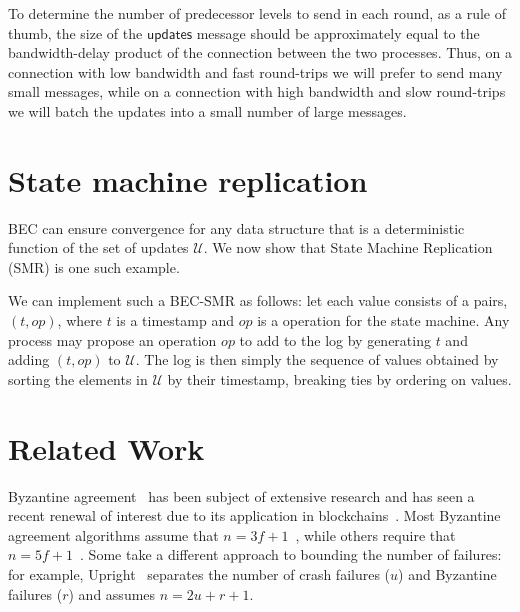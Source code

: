 \documentclass[manuscript,anonymous]{acmart}
\begin{document}
To determine the number of predecessor levels to send in each round, as a rule of thumb, the size of the $\mathsf{updates}$ message should be approximately equal to the bandwidth-delay product of the connection between the two processes.
Thus, on a connection with low bandwidth and fast round-trips we will prefer to send many small messages, while on a connection with high bandwidth and slow round-trips we will batch the updates into a small number of large messages.


\section{State machine replication}

BEC can ensure convergence for any data structure that is a deterministic function of the set of updates $\mathcal{U}$.
We now show that State Machine Replication (SMR) is one such example.

We can implement such a BEC-SMR as follows: let each value consists of a pairs, $(t, op)$, where $t$ is a timestamp and $op$ is a operation for the state machine.
Any process may propose an operation $op$ to add to the log by generating $t$ and adding $(t, op)$ to $\mathcal{U}$.
The log is then simply the sequence of values obtained by sorting the elements in $\mathcal{U}$ by their timestamp, breaking ties by ordering on values.



\section{Related Work}

Byzantine agreement~\cite{Lamport:1982} has been subject of extensive research and has seen a recent renewal of interest due to its application in blockchains~\cite{Bano:2019}.
Most Byzantine agreement algorithms assume that $n=3f+1$~\cite{Castro:1999,Cowling:2006,Kotla:2007,Aublin:2015,Yin:2019}, while others require that $n=5f+1$~\cite{Abd:2005,Martin:2006}.
Some take a different approach to bounding the number of failures: for example, Upright~\cite{Clement:2009} separates the number of crash failures ($u$) and Byzantine failures ($r$) and assumes $n=2u+r+1$.
\end{document}
